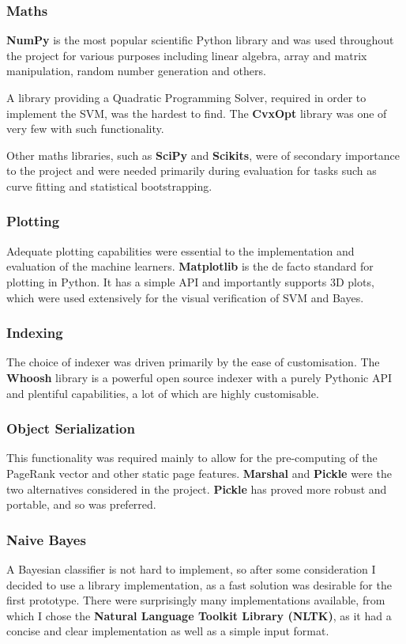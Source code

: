 \documentclass[12pt,notitlepage,twoside]{scrbook}
\begin{document}
\subsubsection*{Maths}
\textbf{NumPy} is the most popular scientific Python library and was used throughout the
project for various purposes including linear algebra, array and matrix manipulation,
random number generation and others.

A library providing a Quadratic Programming Solver, required in order to implement the
SVM, was the hardest to find. The \textbf{CvxOpt} library was one of very few with such
functionality.

Other maths libraries, such as \textbf{SciPy} and \textbf{Scikits}, were of secondary importance to
the project and were needed primarily during evaluation for tasks such as curve fitting and
statistical bootstrapping.
\subsubsection*{Plotting}
Adequate plotting capabilities were essential to the implementation and evaluation of the
machine learners. \textbf{Matplotlib} is the de facto standard for plotting in Python. It
has a simple API and importantly supports 3D plots, which were used extensively for the visual
verification of SVM and Bayes.
\subsubsection*{Indexing}
The choice of indexer was driven primarily by the ease of customisation. The
\textbf{Whoosh} library is a powerful open source indexer with a purely Pythonic API and
plentiful capabilities, a lot of which are highly
customisable.

\subsubsection*{Object Serialization}
This functionality was required mainly to allow for the pre-computing of the PageRank vector
and other static page features. \textbf{Marshal} and \textbf{Pickle} were the two
alternatives considered in the project. \textbf{Pickle} has proved more robust and
portable, and so was preferred.
\subsubsection*{Naive Bayes}
A Bayesian classifier is not hard to implement, so after some consideration I decided to use a library
implementation, as a fast solution was desirable for the first prototype. There were
surprisingly many implementations available, from which I chose the \textbf{Natural
Language Toolkit Library (NLTK)}, as it had a concise and clear implementation as well as a
simple input format.
\end{document}
